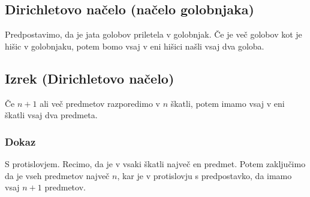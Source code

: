 \subsection{Dirichletovo načelo (načelo golobnjaka)}
Predpostavimo, da je jata golobov priletela v golobnjak. Če je več golobov kot je hišic v golobnjaku, potem bomo vsaj v eni hišici našli vsaj dva goloba.


\subsection{Izrek (Dirichletovo načelo)}
Če $n + 1$ ali več predmetov razporedimo v $n$ škatli, potem imamo vsaj v eni škatli vsaj dva predmeta.



\subsubsection{Dokaz}
S protislovjem. Recimo, da je v vsaki škatli največ en predmet.
Potem zaključimo da je vseh predmetov največ $n$, kar je v protislovju s predpostavko, da imamo vsaj $n+1$ predmetov.


